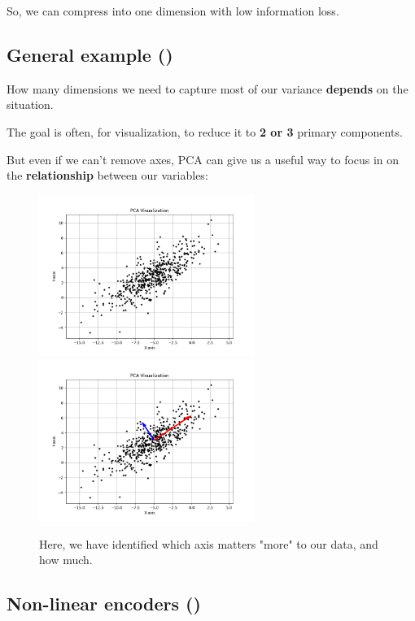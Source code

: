             So, we can compress into one dimension with low information loss.


    \subsection{General example ()}

        How many dimensions we need to capture most of our variance \textbf{depends} on the situation. 

        The goal is often, for visualization, to reduce it to \textbf{2 or 3} primary components.

        But even if we can't remove axes, PCA can give us a useful way to focus in on the \textbf{relationship} between our variables:

        \begin{figure}[H]
            \includegraphics[width=70mm,scale=0.5]{images/autoencoder_images/pca_no_label.png}
            \includegraphics[width=70mm,scale=0.5]{images/autoencoder_images/pca_with_label.png}
            \caption*{Here, we have identified which axis matters "more" to our data, and how much.}
        \end{figure}

        

    \subsection{Non-linear encoders ()}

